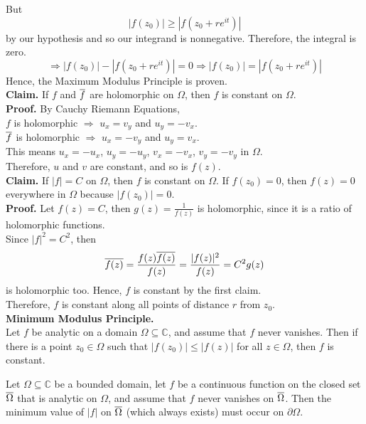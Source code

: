 \documentclass[11pt]{article}
\begin{document}
But 
$$ |f(z_0)| \geqslant |f(z_0 + re^{it})| $$
by our hypothesis and so our integrand is nonnegative. Therefore, the integral is zero.
$$\Rightarrow |f(z_0)| - |f(z_0 + re^{it})| = 0 \Rightarrow |f(z_0)| = |f(z_0 + re^{it})| $$
Hence, the Maximum Modulus Principle is proven. \\
\newline
\textbf{Claim.} If $f$ and $\overline{f}$ are holomorphic on $\Omega$, then $f$ is constant on $\Omega$. \\
\textbf{Proof.} By Cauchy Riemann Equations, \\
$f$ is holomorphic $\Rightarrow$ $u_x = v_y$ and $u_y = -v_x$. \\
$\overline{f}$ is holomorphic $\Rightarrow$ $u_x = -v_y$ and $u_y = v_x$. \\
This means $u_x = -u_x$, $u_y = -u_y$, $v_x = -v_x$, $v_y = -v_y$ in $\Omega$. \\
Therefore, $u$ and $v$ are constant, and so is $f(z)$. \\
\newline
\textbf{Claim.} If $|f| = C$ on $\Omega$, then $f$ is constant on $\Omega$. If $f(z_0) = 0$, then $f(z) = 0$ everywhere in $\Omega$ because $|f(z_0)| = 0$. \\
\textbf{Proof.} Let $f(z) = C$, then $g(z) = \frac{1}{f(z)}$ is holomorphic, since it is a ratio of holomorphic functions. \\
Since $|f|^2 = C^2$, then 
$$\overline{f(z)} = \frac{f(z)\overline{f(z)}}{f(z)} = \frac{|f(z)|^2}{f(z)} = C^2g(z)$$ 
is holomorphic too. Hence, $f$ is constant by the first claim. \\
Therefore, $f$ is constant along all points of distance $r$ from $z_0$. \\
\newline
\textbf{Minimum Modulus Principle.} \\
Let $f$ be analytic on a domain $\Omega \subseteq \mathbb{C}$, and assume that $f$ never vanishes. Then if there is a point $z_0 \in \Omega$ such that $|f(z_0)| \leqslant |f(z)|$ for all $z \in \Omega$, then $f$ is constant.

Let $\Omega \subseteq \mathbb{C}$ be a bounded domain, let $f$ be a continuous function on the closed set $\overline{\Omega}$ that is analytic on $\Omega$, and assume that $f$ never vanishes on $\overline{\Omega}$. Then the minimum value of $|f|$ on $\overline{\Omega}$ (which always exists) must occur on $\partial \Omega$. \\
\end{document}
